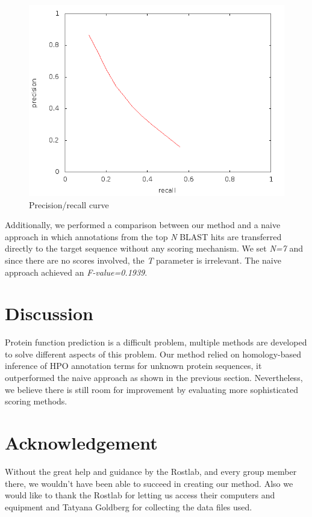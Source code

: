 \documentclass{bioinfo}
\begin{document}
\begin{figure}[!tpb]
\centerline{\includegraphics[scale=0.4]{bilder/image-4.png}}
\caption{Precision/recall curve}
\label{precrec}
\end{figure}

Additionally, we performed a comparison between our method and a naive approach in which annotations from the top \textit{N} BLAST hits are transferred directly to the target sequence without any scoring mechanism. We set \textit{N=7} and since there are no scores involved, the \textit{T} parameter is irrelevant. The naive approach achieved an \textit{F-value=0.1939}.

\section{Discussion}

Protein function prediction is a difficult problem, multiple methods are developed to solve different aspects of this problem. Our method relied on homology-based inference of HPO annotation terms for unknown protein sequences, it outperformed the naive approach as shown in the previous section. Nevertheless, we believe there is still room for improvement by evaluating more sophisticated scoring methods.

\section*{Acknowledgement}
Without the great help and guidance by the Rostlab, and every group member there, we wouldn't have been able to succeed in creating our method. Also we would like to thank the Rostlab for letting us access their computers and equipment and Tatyana Goldberg for collecting the data files used.
\end{document}
